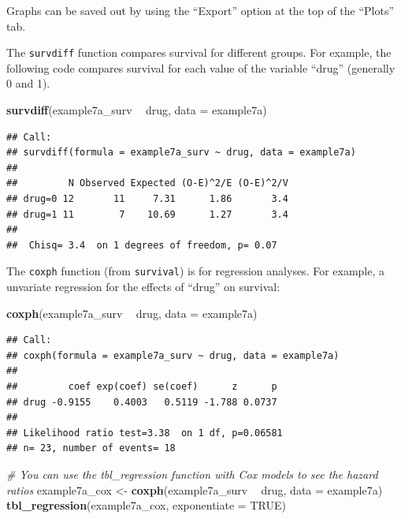 \documentclass[]{book}
\newenvironment{Shaded}{\begin{snugshade}}{\end{snugshade}}
\newcommand{\CommentTok}[1]{\textcolor[rgb]{0.56,0.35,0.01}{\textit{#1}}}
\newcommand{\DataTypeTok}[1]{\textcolor[rgb]{0.13,0.29,0.53}{#1}}
\newcommand{\KeywordTok}[1]{\textcolor[rgb]{0.13,0.29,0.53}{\textbf{#1}}}
\newcommand{\NormalTok}[1]{#1}
\newcommand{\OperatorTok}[1]{\textcolor[rgb]{0.81,0.36,0.00}{\textbf{#1}}}
\newcommand{\OtherTok}[1]{\textcolor[rgb]{0.56,0.35,0.01}{#1}}
\newcommand{\StringTok}[1]{\textcolor[rgb]{0.31,0.60,0.02}{#1}}
\begin{document}
Graphs can be saved out by using the ``Export'' option at the top of the
``Plots'' tab.

The \texttt{survdiff} function compares survival for different groups.
For example, the following code compares survival for each value of the
variable ``drug'' (generally 0 and 1).

\begin{Shaded}
\begin{Highlighting}[]
\KeywordTok{survdiff}\NormalTok{(example7a_surv }\OperatorTok{~}\StringTok{ }\NormalTok{drug, }\DataTypeTok{data =}\NormalTok{ example7a)}
\end{Highlighting}
\end{Shaded}

\begin{verbatim}
## Call:
## survdiff(formula = example7a_surv ~ drug, data = example7a)
## 
##         N Observed Expected (O-E)^2/E (O-E)^2/V
## drug=0 12       11     7.31      1.86       3.4
## drug=1 11        7    10.69      1.27       3.4
## 
##  Chisq= 3.4  on 1 degrees of freedom, p= 0.07
\end{verbatim}

The \texttt{coxph} function (from \texttt{survival}) is for regression
analyses. For example, a unvariate regression for the effects of
``drug'' on survival:

\begin{Shaded}
\begin{Highlighting}[]
\KeywordTok{coxph}\NormalTok{(example7a_surv }\OperatorTok{~}\StringTok{ }\NormalTok{drug, }\DataTypeTok{data =}\NormalTok{ example7a)}
\end{Highlighting}
\end{Shaded}

\begin{verbatim}
## Call:
## coxph(formula = example7a_surv ~ drug, data = example7a)
## 
##         coef exp(coef) se(coef)      z      p
## drug -0.9155    0.4003   0.5119 -1.788 0.0737
## 
## Likelihood ratio test=3.38  on 1 df, p=0.06581
## n= 23, number of events= 18
\end{verbatim}

\begin{Shaded}
\begin{Highlighting}[]
\CommentTok{# You can use the tbl_regression function with Cox models to see the hazard ratios}
\NormalTok{example7a_cox <-}\StringTok{ }\KeywordTok{coxph}\NormalTok{(example7a_surv }\OperatorTok{~}\StringTok{ }\NormalTok{drug, }\DataTypeTok{data =}\NormalTok{ example7a)}
\KeywordTok{tbl_regression}\NormalTok{(example7a_cox, }\DataTypeTok{exponentiate =} \OtherTok{TRUE}\NormalTok{)}
\end{Highlighting}
\end{Shaded}
\end{document}
